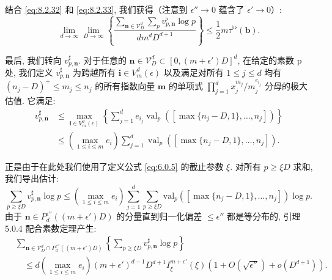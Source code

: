 结合 \eqref{eq:8.2.32} 和 \eqref{eq:8.2.33}, 我们获得（注意到 \(\epsilon'' \to 0\) 蕴含了 \(\epsilon' \to 0\)）:
\begin{equation}\label{eq:8.2.34}
\lim_{d \to \infty} \lim_{D \to \infty} \left\{ \frac{\sum_{\mathbf{n} \in \mathcal{V}_D^d} \sum_{p} v_{p, \mathbf{n}}^{\flat} \log p}{dm^d D^{d+1}} \right\} \le \frac{1}{2} m \tau^{\flat\flat}(\mathbf{b}).
\end{equation}

最后, 我们转向 \(v_{p,\mathbf{n}}^{\sharp}\). 
对于任意的 \(\mathbf{n}\in\mathcal{V}_D^d\subset[0,(m+\epsilon')D]^d\), 在给定的素数 p 处, 
我们定义 \(v_{p,\mathbf{n}}^{\sharp}\) 
为跨越所有 \(\mathbf{i}\in V_m^d(\epsilon)\) 以及满足对所有 \(1\leq j\leq d\) 均有 \((n_j-D)^+\leq m_j\leq n_j\) 的所有指数向量 \(\mathbf{m}\) 
的单项式 \(\prod_{j=1}^d x_j^{m_j}/m_j^{e_{i_j}}\) 分母的极大估值. 
它满足:
\begin{equation}\label{eq:8.2.35}
\begin{aligned}
v_{p,\mathbf{n}}^{\sharp} &\leq \max_{\mathbf{i} \in V_m^d(\epsilon)} \left\{ \sum_{j=1}^d e_{i_j} \operatorname{val}_p([\max\{n_j - D, 1\}, \dots, n_j]) \right\} \\
&\leq \left( \max_{1 \leq i \leq m} e_i \right) \sum_{j=1}^d \operatorname{val}_p\left([\max\{n_j - D, 1\}, \dots, n_j]\right).
\end{aligned}
\end{equation}

正是由于在此处我们使用了定义公式 \eqref{eq:6.0.5} 的截止参数 \(\xi\). 
对所有 \(p \geq \xi D\) 求和, 我们导出估计:
\begin{equation}\label{eq:8.2.36}
\sum_{p \ge \xi D} v_{p,\mathbf{n}}^{\sharp} \log p \le \left( \max_{1 \le i \le m} e_i \right) \sum_{j=1}^{d} \sum_{p \ge \xi D} \text{val}_p([\max\{n_j - D, 1\}, \dots, n_j]) \log p.
\end{equation}
由于 \(\mathbf{n} \in P_d^{\epsilon''}((m+\epsilon')D)\) 的分量直到归一化偏差 \(\le \epsilon''\) 都是等分布的, 
引理 5.0.4 配合素数定理产生:
\begin{equation}\label{eq:8.2.37}
\begin{aligned}
&\sum_{\mathbf{n} \in \mathcal{V}_{D}^{d} \cap P_{d}^{\epsilon''}((m+\epsilon')D)} \left\{ \sum_{p \geq \xi D} v_{p,\mathbf{n}}^{\sharp} \log p \right\} \\
&\quad \leq d \left( \max_{1 \leq i \leq m} e_{i} \right) (m+\epsilon')^{d-1} D^{d+1} I_{\xi}^{m+\epsilon'}(\xi) \left( 1 + O(\sqrt{\epsilon''}) + o(D^{d+1}) \right).
\end{aligned}
\end{equation}

